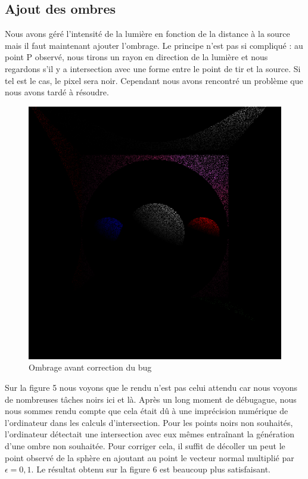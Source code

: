 \documentclass[11pt, oneside]{article}   	%
\begin{document}
\subsection{Ajout des ombres}
Nous avons géré l'intensité de la lumière en fonction de la distance à la source mais il faut maintenant ajouter l'ombrage. Le principe n'est pas si compliqué : au point P observé, nous tirons un rayon en direction de la lumière et nous regardons s'il y a intersection avec une forme entre le point de tir et la source. Si tel est le cas, le pixel sera noir. Cependant nous avons rencontré un problème que nous avons tardé à résoudre.

\begin{figure}
    \centering
    \includegraphics[scale=0.2]{rapport/result 4.png}
    \caption{Ombrage avant correction du bug}
    \label{fig:my_label}
\end{figure}

Sur la figure 5 nous voyons que le rendu n'est pas celui attendu car nous voyons de nombreuses tâches noirs ici et là. Après un long moment de débugague, nous nous sommes rendu compte que cela était dû à une imprécision numérique de l'ordinateur dans les calculs d'intersection. Pour les points noirs non souhaités, l'ordinateur détectait une intersection avec eux mêmes entraînant la génération d'une ombre non souhaitée. Pour corriger cela, il suffit de décoller un peut le point observé de la sphère en ajoutant au point le vecteur normal multiplié par $\epsilon = 0,1$. Le résultat obtenu sur la figure 6 est beaucoup plus satisfaisant.
\end{document}
